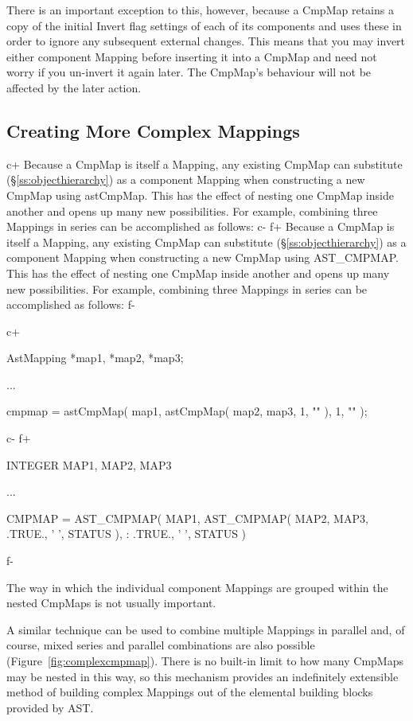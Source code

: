 \documentclass[twoside,11pt]{starlink}
\providecommand{\secref}[1]{\S\ref{#1}}
\begin{document}
There is an important exception to this, however, because a CmpMap
retains a copy of the initial Invert flag settings of each of its
components and uses these in order to ignore any subsequent external
changes. This means that you may invert either component Mapping
before inserting it into a CmpMap and need not worry if you un-invert
it again later. The CmpMap's behaviour will not be affected by the
later action.

\subsection{\label{ss:complexcmpmap}Creating More Complex Mappings}

c+
Because a CmpMap is itself a Mapping, any existing CmpMap can
substitute (\secref{ss:objecthierarchy}) as a component Mapping when
constructing a new CmpMap using astCmpMap. This has the effect of
nesting one CmpMap inside another and opens up many new possibilities.
For example, combining three Mappings in series can be accomplished as
follows:
c-
f+
Because a CmpMap is itself a Mapping, any existing CmpMap can
substitute (\secref{ss:objecthierarchy}) as a component Mapping when
constructing a new CmpMap using AST\_CMPMAP. This has the effect of
nesting one CmpMap inside another and opens up many new possibilities.
For example, combining three Mappings in series can be accomplished as
follows:
f-

c+
\small
\begin{terminalv}
AstMapping *map1, *map2, *map3;

...

cmpmap = astCmpMap( map1, astCmpMap( map2, map3, 1, "" ), 1, "" );
\end{terminalv}
\normalsize
c-
f+
\small
\begin{terminalv}
      INTEGER MAP1, MAP2, MAP3

      ...

      CMPMAP = AST_CMPMAP( MAP1, AST_CMPMAP( MAP2, MAP3, .TRUE., ' ', STATUS ),
     :                     .TRUE., ' ', STATUS )
\end{terminalv}
\normalsize
f-

The way in which the individual component Mappings are grouped within
the nested CmpMaps is not usually important.

A similar technique can be used to combine multiple Mappings in
parallel and, of course, mixed series and parallel combinations are
also possible (Figure~\ref{fig:complexcmpmap}).  There is no built-in
limit to how many CmpMaps may be nested in this way, so this mechanism
provides an indefinitely extensible method of building complex
Mappings out of the elemental building blocks provided by AST.
\end{document}
